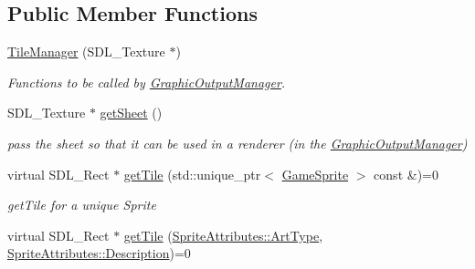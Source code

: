 \subsection*{Public Member Functions}
\begin{DoxyCompactItemize}
\item 
\mbox{\label{class_tile_manager_a1cac9e081272aebacdfe9150266f64aa}} 
\mbox{\hyperlink{class_tile_manager_a1cac9e081272aebacdfe9150266f64aa}{Tile\+Manager}} (S\+D\+L\+\_\+\+Texture $\ast$)
\begin{DoxyCompactList}\small\item\em Functions to be called by \mbox{\hyperlink{class_graphic_output_manager}{Graphic\+Output\+Manager}}. \end{DoxyCompactList}\item 
\mbox{\label{class_tile_manager_a12b83eb0369a54b3abe87477c98fb40a}} 
S\+D\+L\+\_\+\+Texture $\ast$ \mbox{\hyperlink{class_tile_manager_a12b83eb0369a54b3abe87477c98fb40a}{get\+Sheet}} ()
\begin{DoxyCompactList}\small\item\em pass the sheet so that it can be used in a renderer (in the \mbox{\hyperlink{class_graphic_output_manager}{Graphic\+Output\+Manager}}) \end{DoxyCompactList}\item 
\mbox{\label{class_tile_manager_aa9094370bebe03d18969c7ca2e98ce61}} 
virtual S\+D\+L\+\_\+\+Rect $\ast$ \mbox{\hyperlink{class_tile_manager_aa9094370bebe03d18969c7ca2e98ce61}{get\+Tile}} (std\+::unique\+\_\+ptr$<$ \mbox{\hyperlink{class_game_sprite}{Game\+Sprite}} $>$ const \&)=0
\begin{DoxyCompactList}\small\item\em get\+Tile for a unique Sprite \end{DoxyCompactList}\item 
\mbox{\label{class_tile_manager_a35eb6807fd296270fef400dae3e0628c}} 
virtual S\+D\+L\+\_\+\+Rect $\ast$ \mbox{\hyperlink{class_tile_manager_a35eb6807fd296270fef400dae3e0628c}{get\+Tile}} (\mbox{\hyperlink{namespace_sprite_attributes_afb5447c311bc29f0ce8ddfd025c6e998}{Sprite\+Attributes\+::\+Art\+Type}}, \mbox{\hyperlink{namespace_sprite_attributes_a3ece96d6288b14d53d84e2138392395c}{Sprite\+Attributes\+::\+Description}})=0

\end{DoxyCompactItemize}
